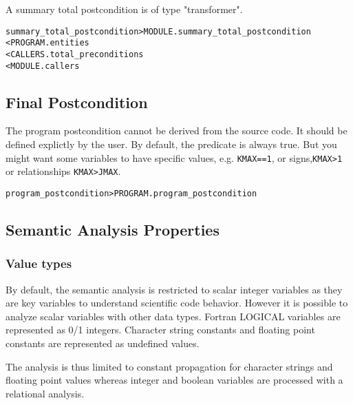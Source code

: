 \documentclass[a4paper]{report}
\newenvironment{PipsMake}{\begin{alltt}}{\end{alltt}}
\begin{document}
A summary total postcondition is of type "transformer".

\begin{PipsMake}
summary_total_postcondition            > MODULE.summary_total_postcondition
        < PROGRAM.entities
        < CALLERS.total_preconditions
        < MODULE.callers
\end{PipsMake}

\subsection{Final Postcondition}
\label{subsubsection-final-postcondition}

The program postcondition cannot be derived from the source code. It
should be defined explictly by the user. By default, the predicate is
always true. But you might want some variables to have specific values,
e.g. \verb+KMAX==1+, or signs,\verb+KMAX>1+ or relationships
\verb+KMAX>JMAX+.

\begin{PipsMake}
program_postcondition     > PROGRAM.program_postcondition
\end{PipsMake}

\subsection{Semantic Analysis Properties}
\label{subsection-semantic-analysis}

\subsubsection{Value types}

By default, the semantic analysis is restricted to scalar integer
variables as they are key variables to understand scientific code
behavior. However it is possible to analyze scalar variables with other
data types. Fortran LOGICAL variables are represented as 0/1
integers. Character string constants and floating point constants are
represented as undefined values.

The analysis is thus limited to constant propagation for character strings
and floating point values whereas integer and boolean variables are
processed with a relational analysis.
\end{document}

